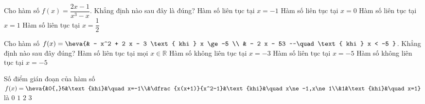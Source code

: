 \begin{ex}%
	Cho hàm số $f\left( x \right)=\dfrac{2x-1}{{{x}^{3}}-x}$. Khẳng định  nào sau đây là đúng?
	 \choice
		 {Hàm số liên tục tại $x=-1$}
		 {Hàm số liên tục tại $x=0$}
		{Hàm số liên tục tại $x=1$} 
		{\True Hàm số liên  tục tại $x=\dfrac{1}{2}$}
\end{ex}

\begin{ex}%
	Cho hàm  số $f(x)=\heva{&
	- x^2 + 2 x -  3 \text{ khi } x \ge -5 \\
	& - 2 x - 53 ~~\quad\text{ khi } x < -5 }$. Khẳng  định nào sau đây đúng?
	 \choice
		 { Hàm số liên tục tại mọi $x\in \mathbb{R}$}
		{ Hàm số không  liên tục tại $x=-3$}
		{ Hàm số liên tục tại $x=-5$} 
		{ \True Hàm số  không liên tục tại $x=-5$}
\end{ex}

\begin{ex}%
	Số điểm  gián đoạn của hàm số $f(x)=\heva{&0{,}5&\text{khi}&\quad x=-1\\&\dfrac{x(x+1)}{x^2-1}&\text{khi}&\quad x\ne -1,x\ne 1\\&1&\text{khi}&\quad x=1}$ là
	\choice 
		 {$0$}
		{\True  $1$}
		 {$2$}
		{$3$} 
\end{ex}

